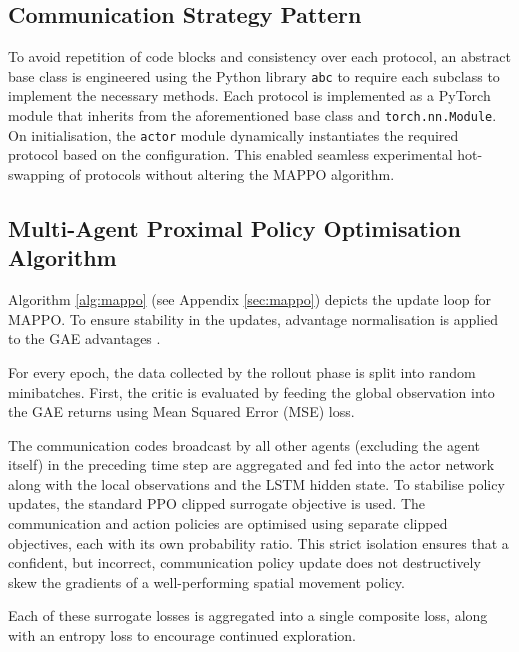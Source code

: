 \subsection{Communication Strategy Pattern}
\label{sec:3.3.5}


To avoid repetition of code blocks and consistency over each protocol, an abstract base class is engineered using the Python library \lstinline[language=Python]|abc| to require each subclass to implement the necessary methods.
Each protocol is implemented as a PyTorch module that inherits from the aforementioned base class and \lstinline[language=Python]|torch.nn.Module|.
On initialisation, the \lstinline[language=Python]|actor| module dynamically instantiates the required protocol based on the configuration.
This enabled seamless experimental hot-swapping of protocols without altering the MAPPO algorithm.

\subsection{Multi-Agent Proximal Policy Optimisation Algorithm}
\label{sec:3.3.6}

Algorithm \ref{alg:mappo} (see Appendix \ref{sec:mappo}) depicts the update loop for MAPPO.
To ensure stability in the updates, advantage normalisation is applied to the GAE advantages \cite{gae_normalisation}.

For every epoch, the data collected by the rollout phase is split into random minibatches.
First, the critic is evaluated by feeding the global observation into the GAE returns using Mean Squared Error (MSE) loss.

The communication codes broadcast by all other agents (excluding the agent itself) in the preceding time step are aggregated and fed into the actor network along with the local observations and the LSTM hidden state.
To stabilise policy updates, the standard PPO clipped surrogate objective is used.
The communication and action policies are optimised using separate clipped objectives, each with its own probability ratio.
This strict isolation ensures that a confident, but incorrect, communication policy update does not destructively skew the gradients of a well-performing spatial movement policy.

Each of these surrogate losses is aggregated into a single composite loss, along with an entropy loss to encourage continued exploration.

